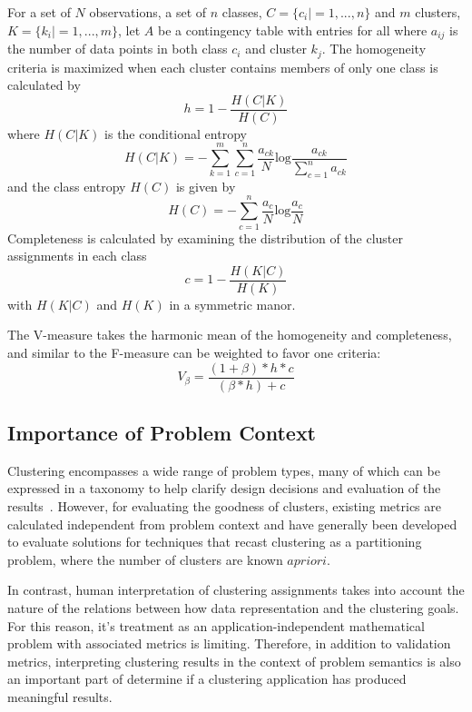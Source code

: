 For a set of $N$ observations, a set of $n$ classes, $C=\{c_i|=1,...,n\}$ and $m$ clusters, $K=\{k_i|=1,...,m\}$, let $A$ be a contingency table with entries for all where $a_{ij}$ is the number of data points in both class $c_i$ and cluster $k_j$.  The homogeneity criteria is maximized when each cluster contains members of only one class is calculated by
$$h = 1-\frac{H(C|K)}{H(C)}$$
\noindent where $H(C|K)$ is the conditional entropy
$$H(C|K)=-\sum_{k=1}^m \sum_{c=1}^n \frac{a_{ck}}{N}\text{log} \frac{a_{ck}}{\sum_{c=1}^n {a_{ck}}}$$
\noindent and the class entropy $H(C)$ is given by
$$H(C)=-\sum_{c=1}^n \frac{a_c}{N}\text{log} \frac{a_c}{N}$$
\noindent Completeness is calculated by examining the distribution of the cluster assignments in each class
$$c = 1-\frac{H(K|C)}{H(K)}$$
\noindent with $H(K|C)$ and $H(K)$ in a symmetric manor.

The V-measure takes the harmonic mean of the homogeneity and completeness, and similar to the F-measure can be weighted to favor one criteria:
$$V_\beta = \frac{(1+\beta)*h*c}{(\beta*h)+c}$$ 

\subsection{Importance of Problem Context}
Clustering encompasses a wide range of problem types, many of which can be expressed in a taxonomy to help clarify design decisions and evaluation of the results~\cite{Guyon,Blum}.  However, for evaluating the goodness of clusters, existing metrics are calculated independent from problem context and have generally been developed to evaluate solutions for techniques that recast clustering as a partitioning problem, where the number of clusters are known $a priori$.

In contrast, human interpretation of clustering assignments takes into account the nature of the relations between how data representation and the clustering goals.  For this reason, it's treatment as an application-independent mathematical problem with associated metrics is limiting.  Therefore, in addition to validation metrics, interpreting clustering results in the context of problem semantics is also an important part of determine if a clustering application has produced meaningful results.
